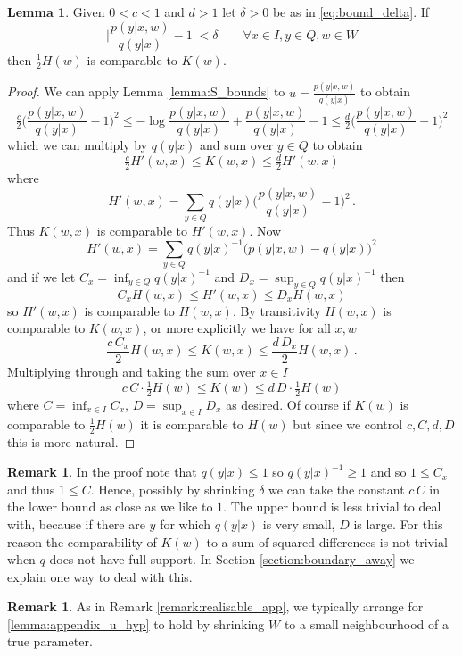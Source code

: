 \documentclass[english,letter paper,12pt,reqno]{article}
\theoremstyle{definition}
\newtheorem{lemma}[theorem]{Lemma}
\newtheorem{remark}[theorem]{Remark}
\def\be{\begin{equation}}
\def\ee{\end{equation}}
\begin{document}
\begin{lemma}\label{lemma:H_comparable_K} Given $0 < c < 1$ and $d > 1$ let $\delta > 0$ be as in \eqref{eq:bound_delta}. If 
\be\label{lemma:appendix_u_hyp}
\Bigg| \frac{p(y|x,w)}{q(y|x)} - 1 \Bigg| < \delta \qquad \forall x \in I, y \in Q, w \in W
\ee
then $\tfrac{1}{2} H(w)$ is comparable to $K(w)$.
\end{lemma}
\begin{proof}
We can apply Lemma \ref{lemma:S_bounds} to $u = \frac{p(y|x,w)}{q(y|x)}$ to obtain
\[
\tfrac{c}{2}\Bigg( \frac{p(y|x,w)}{q(y|x)} - 1 \Bigg)^2 \le -\log  \frac{p(y|x,w)}{q(y|x)} +  \frac{p(y|x,w)}{q(y|x)} - 1 \le \tfrac{d}{2}\Bigg( \frac{p(y|x,w)}{q(y|x)} - 1 \Bigg)^2
\]
which we can multiply by $q(y|x)$ and sum over $y \in Q$ to obtain
\be
\tfrac{c}{2} H'(w,x) \le K(w,x) \le \tfrac{d}{2} H'(w,x)
\ee
where
\[
H'(w,x) = \sum_{y \in Q} q(y|x)\Bigg( \frac{p(y|x,w)}{q(y|x)} - 1 \Bigg)^2\,.
\]
Thus $K(w,x)$ is comparable to $H'(w,x)$. Now
\[
H'(w,x) = \sum_{y \in Q} q(y|x)^{-1}\Big( p(y|x,w) - q(y|x) \Big)^2
\]
and if we let $C_x = \inf_{y \in Q} q(y|x)^{-1}$ and $D_x = \sup_{y \in Q} q(y|x)^{-1}$ then
\[
C_x H(w,x) \le H'(w,x) \le D_x H(w,x)
\]
so $H'(w,x)$ is comparable to $H(w,x)$. By transitivity $H(w,x)$ is comparable to $K(w,x)$, or more explicitly we have for all $x,w$
\[
\frac{c \, C_x}{2} H(w,x) \le K(w,x) \le \frac{d \, D_x}{2} H(w,x)\,.
\]
Multiplying through and taking the sum over $x \in I$
\[
c \, C \cdot \tfrac{1}{2} H(w) \le K(w) \le d \, D \cdot \tfrac{1}{2} H(w)
\]
where $C = \inf_{x \in I} C_x$, $D = \sup_{x \in I} D_x$ as desired. Of course if $K(w)$ is comparable to $\tfrac{1}{2} H(w)$ it is comparable to $H(w)$ but since we control $c, C, d, D$ this is more natural.
\end{proof}

\begin{remark} In the proof note that $q(y|x) \le 1$ so $q(y|x)^{-1} \ge 1$ and so $1 \le C_x$ and thus $1 \le C$. Hence, possibly by shrinking $\delta$ we can take the constant $c\,C$ in the lower bound as close as we like to $1$. The upper bound is less trivial to deal with, because if there are $y$ for which $q(y|x)$ is very small, $D$ is large. For this reason the comparability of $K(w)$ to a sum of squared differences is not trivial when $q$ does not have full support. In Section \ref{section:boundary_away} we explain one way to deal with this.
\end{remark}

\begin{remark}
As in Remark \ref{remark:realisable_app}, we typically arrange for \eqref{lemma:appendix_u_hyp} to hold by shrinking $W$ to a small neighbourhood of a true parameter.
\end{remark}
\end{document}
